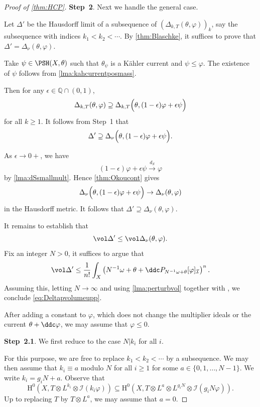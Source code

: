 \begin{proof}[Proof of \cref{thm:HCP}]
\textbf{Step~2}. Next we handle the general case.

Let $\Delta'$ be the Hausdorff limit of a subsequence of $(\Delta_{k,T}(\theta,\varphi))_k$, say the subsequence with indices $k_1<k_2<\cdots$.
By \cref{thm:Blaschke}, it suffices to prove that $\Delta'=\Delta_{\nu}(\theta,\varphi)$.

Take $\psi\in \PSH(X,\theta)$ such that $\theta_{\psi}$ is a Kähler current and $\psi\leq \varphi$. The existence of $\psi$ follows from \cref{lma:kahcurrentposmass}.

    Then for any $\epsilon\in \mathbb{Q}\cap (0,1)$,
    \[
        \Delta_{k,T}(\theta,\varphi)\supseteq \Delta_{k,T}\Bigl(\theta,(1-\epsilon)\varphi+\epsilon\psi \Bigr)
    \]
    for all $k\geq 1$. It follows from Step~1 that
    \[
        \Delta' \supseteq \Delta_{\nu}\Bigl(\theta,(1-\epsilon)\varphi+\epsilon\psi\Bigr).
    \]

    As $\epsilon\to 0+$, we have
    \[
        (1-\epsilon)\varphi+\epsilon\psi\xrightarrow{d_S}\varphi
    \]
    by \cref{lma:dSsmallmult}. Hence \cref{thm:Okoucont} gives
    \[
        \Delta_{\nu}\Bigl(\theta,(1-\epsilon)\varphi+\epsilon\psi\Bigr)\to\Delta_{\nu}(\theta,\varphi)
    \]
    in the Hausdorff metric. It follows that $\Delta' \supseteq \Delta_{\nu}(\theta,\varphi)$.

    It remains to establish that
    \begin{equation}\label{eq:Deltapvolumeupp}
        \vol \Delta'\leq \vol \Delta_{\nu}(\theta,\varphi).
    \end{equation}
    Fix an integer $N>0$, it suffices to argue that
    \begin{equation}\label{eq:Deltapvolumeupp2}
        \vol \Delta'\leq \frac{1}{n!} \int_X \left(N^{-1}\omega+\theta+\ddc P_{N^{-1}\omega+\theta}[\varphi]_{\mathcal{I}}\right)^n.
    \end{equation}
    Assuming this, letting $N\to\infty$ and using \cref{lma:perturbvol} together with , we conclude \eqref{eq:Deltapvolumeupp}.

    After adding a constant to $\varphi$, which does not change the multiplier ideals or the current $\theta+\ddc\varphi$, we may assume that $\varphi\leq 0$.

    \textbf{Step~2.1}. We first reduce to the case $N|k_i$ for all $i$.

    For this purpose, we are free to replace $k_1<k_2<\cdots$ by a subsequence. We may then assume that $k_i\equiv a$ modulo $N$ for all $i\geq 1$ for some $a\in \{0,1,\ldots,N-1\}$. We write $k_i=g_iN +a$. Observe that
    \[
        \mathrm{H}^0\left(X,T\otimes L^{k_i}\otimes \mathcal{I}(k_i \varphi)\right)\subseteq \mathrm{H}^0\left(X, T\otimes L^a \otimes L^{g_i N}\otimes \mathcal{I}(g_i N \varphi) \right).
    \]
    Up to replacing $T$ by $T\otimes L^a$, we may assume that $a=0$.


\end{proof}
